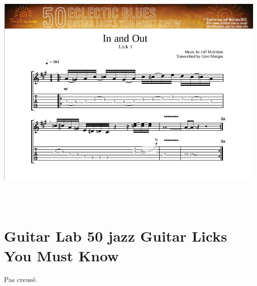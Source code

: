 \documentclass[a4paper]{book}
\begin{document}
\begin{center}
\includegraphics[width=17cm,height=12.084cm]{lebluessupportsmethodes-img88.png}
\end{center}








\clearpage\section[Guitar Lab 50 jazz Guitar Licks You Must
Know]{Guitar Lab 50 jazz Guitar Licks You Must Know}
\hypertarget{RefHeadingToc150973218262}{}Pas creus\'e.
\end{document}
